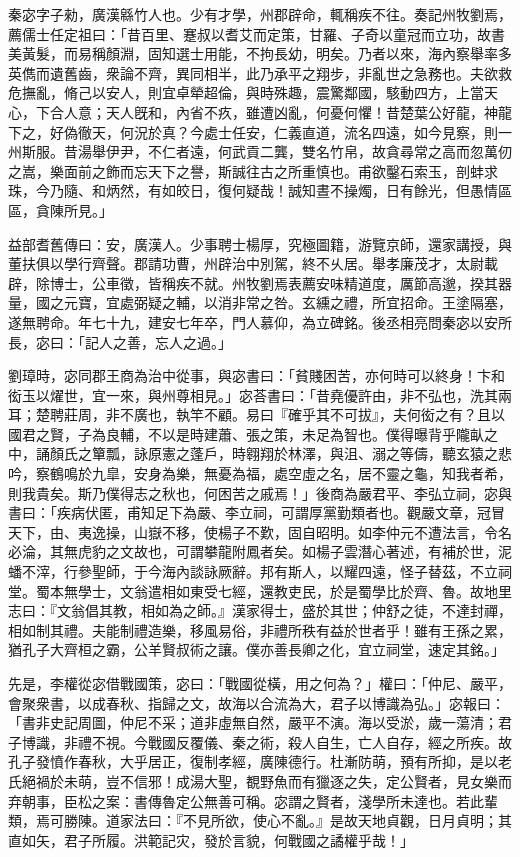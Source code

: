 
\begin{pinyinscope}
秦宓字子勑，廣漢緜竹人也。少有才學，州郡辟命，輒稱疾不往。奏記州牧劉焉，薦儒士任定祖曰：「昔百里、蹇叔以耆艾而定策，甘羅、子奇以童冠而立功，故書美黃髮，而易稱顏淵，固知選士用能，不拘長幼，明矣。乃者以來，海內察舉率多英儁而遺舊齒，衆論不齊，異同相半，此乃承平之翔步，非亂世之急務也。夫欲救危撫亂，脩己以安人，則宜卓犖超倫，與時殊趣，震驚鄰國，駭動四方，上當天心，下合人意；天人旣和，內省不疚，雖遭凶亂，何憂何懼！昔楚葉公好龍，神龍下之，好偽徹天，何況於真？今處士任安，仁義直道，流名四遠，如今見察，則一州斯服。昔湯舉伊尹，不仁者遠，何武貢二龔，雙名竹帛，故貪尋常之高而忽萬仞之嵩，樂面前之飾而忘天下之譽，斯誠往古之所重慎也。甫欲鑿石索玉，剖蚌求珠，今乃隨、和炳然，有如皎日，復何疑哉！誠知晝不操燭，日有餘光，但愚情區區，貪陳所見。」

益部耆舊傳曰：安，廣漢人。少事聘士楊厚，究極圖籍，游覽京師，還家講授，與董扶俱以學行齊聲。郡請功曹，州辟治中別駕，終不乆居。舉孝廉茂才，太尉載辟，除博士，公車徵，皆稱疾不就。州牧劉焉表薦安味精道度，厲節高邈，揆其器量，國之元寶，宜處弼疑之輔，以消非常之咎。玄纁之禮，所宜招命。王塗隔塞，遂無聘命。年七十九，建安七年卒，門人慕仰，為立碑銘。後丞相亮問秦宓以安所長，宓曰：「記人之善，忘人之過。」

劉璋時，宓同郡王商為治中從事，與宓書曰：「貧賤困苦，亦何時可以終身！卞和衒玉以燿世，宜一來，與州尊相見。」宓荅書曰：「昔堯優許由，非不弘也，洗其兩耳；楚聘莊周，非不廣也，執竿不顧。易曰『確乎其不可拔』，夫何衒之有？且以國君之賢，子為良輔，不以是時建蕭、張之策，未足為智也。僕得曝背乎隴畒之中，誦顏氏之簞瓢，詠原憲之蓬戶，時翱翔於林澤，與沮、溺之等儔，聽玄猿之悲吟，察鶴鳴於九皐，安身為樂，無憂為福，處空虛之名，居不靈之龜，知我者希，則我貴矣。斯乃僕得志之秋也，何困苦之戚焉！」後商為嚴君平、李弘立祠，宓與書曰：「疾病伏匿，甫知足下為嚴、李立祠，可謂厚黨勤類者也。觀嚴文章，冠冒天下，由、夷逸操，山嶽不移，使楊子不歎，固自昭明。如李仲元不遭法言，令名必淪，其無虎豹之文故也，可謂攀龍附鳳者矣。如楊子雲潛心著述，有補於世，泥蟠不滓，行參聖師，于今海內談詠厥辭。邦有斯人，以耀四遠，怪子替茲，不立祠堂。蜀本無學士，文翁遣相如東受七經，還教吏民，於是蜀學比於齊、魯。故地里志曰：『文翁倡其教，相如為之師。』漢家得士，盛於其世；仲舒之徒，不達封禪，相如制其禮。夫能制禮造樂，移風易俗，非禮所秩有益於世者乎！雖有王孫之累，猶孔子大齊桓之霸，公羊賢叔術之讓。僕亦善長卿之化，宜立祠堂，速定其銘。」

先是，李權從宓借戰國策，宓曰：「戰國從橫，用之何為？」權曰：「仲尼、嚴平，會聚衆書，以成春秋、指歸之文，故海以合流為大，君子以博識為弘。」宓報曰：「書非史記周圖，仲尼不采；道非虛無自然，嚴平不演。海以受淤，歲一蕩清；君子博識，非禮不視。今戰國反覆儀、秦之術，殺人自生，亡人自存，經之所疾。故孔子發憤作春秋，大乎居正，復制孝經，廣陳德行。杜漸防萌，預有所抑，是以老氏絕禍於未萌，豈不信邪！成湯大聖，覩野魚而有獵逐之失，定公賢者，見女樂而弃朝事，臣松之案：書傳魯定公無善可稱。宓謂之賢者，淺學所未達也。若此輩類，焉可勝陳。道家法曰：『不見所欲，使心不亂。』是故天地貞觀，日月貞明；其直如矢，君子所履。洪範記灾，發於言貌，何戰國之譎權乎哉！」


\end{pinyinscope}
